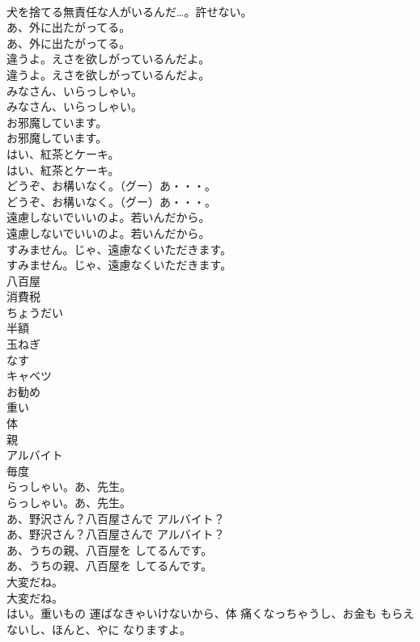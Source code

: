 \documentclass[8pt]{extreport}
\begin{document}
\begin{CJK}{UTF8}{min}
\\	犬を捨てる無責任な人がいるんだ…。許せない。 
\\	あ、外に出たがってる。	
\\	あ、外に出たがってる。 
\\	違うよ。えさを欲しがっているんだよ。	
\\	違うよ。えさを欲しがっているんだよ。 
\\	みなさん、いらっしゃい。	
\\	みなさん、いらっしゃい。 
\\	お邪魔しています。	
\\	お邪魔しています。 
\\	はい、紅茶とケーキ。	
\\	はい、紅茶とケーキ。 
\\	どうぞ、お構いなく。（グー）あ・・・。	
\\	どうぞ、お構いなく。（グー）あ・・・。 
\\	遠慮しないでいいのよ。若いんだから。	
\\	遠慮しないでいいのよ。若いんだから。 
\\	すみません。じゃ、遠慮なくいただきます。	
\\	すみません。じゃ、遠慮なくいただきます。 
\\	八百屋
\\	消費税
\\	ちょうだい
\\	半額
\\	玉ねぎ
\\	なす
\\	キャベツ
\\	お勧め
\\	重い
\\	体
\\	親
\\	アルバイト
\\	毎度
\\	らっしゃい。あ、先生。	
\\	らっしゃい。あ、先生。 
\\	あ、野沢さん？八百屋さんで アルバイト？	
\\	あ、野沢さん？八百屋さんで アルバイト？ 
\\	あ、うちの親、八百屋を してるんです。	
\\	あ、うちの親、八百屋を してるんです。 
\\	大変だね。	
\\	大変だね。 
\\	はい。重いもの 運ばなきゃいけないから、体 痛くなっちゃうし、お金も もらえないし、ほんと、やに なりますよ。	

\end{CJK}
\end{document}
